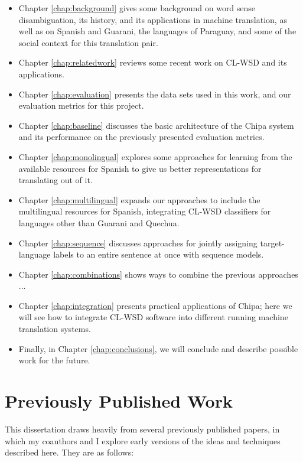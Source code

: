 \begin{itemize}
\item Chapter \ref{chap:background} gives some background on word sense
disambiguation, its history, and its applications in machine translation, as
well as on Spanish and Guarani, the languages of Paraguay, and some of the
social context for this translation pair.
\item Chapter \ref{chap:relatedwork} reviews some recent work on CL-WSD and its
applications.
\item Chapter \ref{chap:evaluation} presents the data sets used in this work,
and our evaluation metrics for this project.
\item Chapter \ref{chap:baseline} discusses the basic architecture of the
Chipa system and its performance on the previously presented evaluation metrics.
\item Chapter \ref{chap:monolingual} explores some approaches for learning from
the available resources for Spanish to give us better representations for
translating out of it.
\item Chapter \ref{chap:multilingual} expands our approaches to include the
multilingual resources for Spanish, integrating CL-WSD classifiers for
languages other than Guarani and Quechua.
\item Chapter \ref{chap:sequence} discusses approaches for jointly assigning
target-language labels to an entire sentence at once with sequence models.
\item Chapter \ref{chap:combinations} shows ways to combine the previous
approaches ... %
\item Chapter \ref{chap:integration} presents practical applications of Chipa;
here we will see how to integrate CL-WSD software into different running
machine translation systems.
\item Finally, in Chapter \ref{chap:conclusions}, we will conclude and describe
possible work for the future.
\end{itemize}

\section{Previously Published Work}
This dissertation draws heavily from several previously published papers, in
which my coauthors and I explore early versions of the ideas and techniques
described here. They are as follows:

